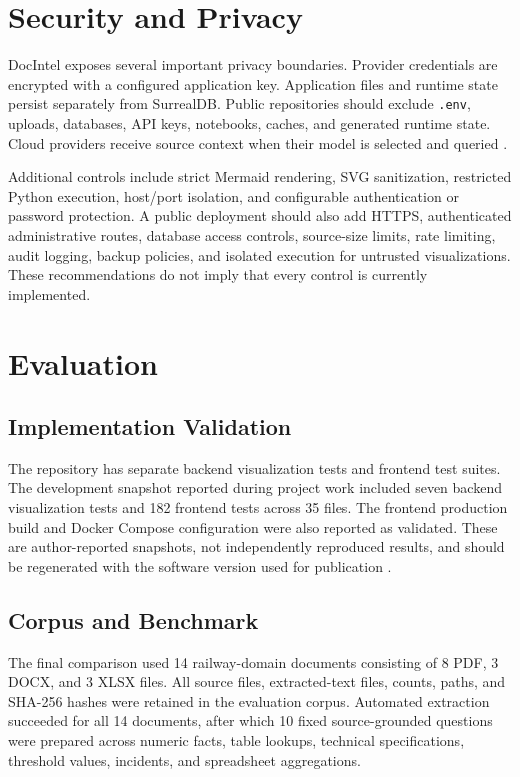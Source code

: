 \documentclass[conference]{IEEEtran}
\begin{document}
\section{Security and Privacy}
DocIntel exposes several important privacy boundaries. Provider credentials are encrypted with a configured application key. Application files and runtime state persist separately from SurrealDB. Public repositories should exclude \texttt{.env}, uploads, databases, API keys, notebooks, caches, and generated runtime state. Cloud providers receive source context when their model is selected and queried \cite{docintel}.

Additional controls include strict Mermaid rendering, SVG sanitization, restricted Python execution, host/port isolation, and configurable authentication or password protection. A public deployment should also add HTTPS, authenticated administrative routes, database access controls, source-size limits, rate limiting, audit logging, backup policies, and isolated execution for untrusted visualizations. These recommendations do not imply that every control is currently implemented.

\section{Evaluation}
\subsection{Implementation Validation}
The repository has separate backend visualization tests and frontend test suites. The development snapshot reported during project work included seven backend visualization tests and 182 frontend tests across 35 files. The frontend production build and Docker Compose configuration were also reported as validated. These are author-reported snapshots, not independently reproduced results, and should be regenerated with the software version used for publication \cite{docintel}.

\subsection{Corpus and Benchmark}
The final comparison used 14 railway-domain documents consisting of 8 PDF, 3 DOCX, and 3 XLSX files. All source files, extracted-text files, counts, paths, and SHA-256 hashes were retained in the evaluation corpus. Automated extraction succeeded for all 14 documents, after which 10 fixed source-grounded questions were prepared across numeric facts, table lookups, technical specifications, threshold values, incidents, and spreadsheet aggregations.
\end{document}
